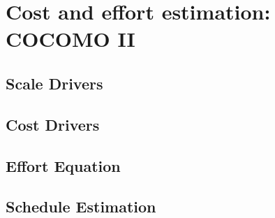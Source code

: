 \section{Cost and effort estimation: COCOMO II}

\subsection{Scale Drivers}
\blindtext

\subsection{Cost Drivers}
\blindtext

\subsection{Effort Equation}
\blindtext

\subsection{Schedule Estimation}
\blindtext
